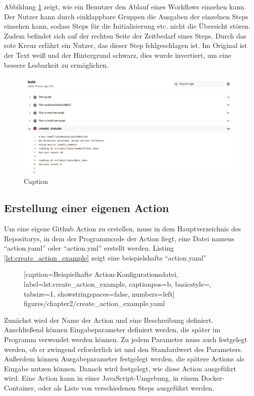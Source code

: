 Abbildung \ref{fig:workflow_output} zeigt, wie ein Benutzer den Ablauf eines Workflows einsehen kann. Der Nutzer kann durch einklappbare Gruppen die Ausgaben der einzelnen Steps einsehen kann, sodass Steps für die Initialisierung etc. nicht die Übersicht stören. Zudem befindet sich auf der rechten Seite der Zeitbedarf eines Steps. Durch das rote Kreuz erfährt ein Nutzer, das dieser Step fehlgeschlagen ist. Im Original ist der Text weiß und der Hintergrund schwarz, dies wurde invertiert, um eine bessere Lesbarkeit zu ermöglichen. 
\begin{figure}
    \centering
    \includegraphics[width=\columnwidth]{figures/chapter2/workflow_output2.png}
    \caption{Caption}
    \label{fig:workflow_output}
\end{figure}
\subsection{Erstellung einer eigenen Action}
Um eine eigene Github Action zu erstellen, muss in dem Hauptverzeichnis des Repositorys, in dem der Programmcode der Action liegt, eine Datei namens \enquote{action.yaml} oder \enquote{action.yml} erstellt werden. Listing \ref{lst:create_action_example} zeigt eine beispielshafte \enquote{action.yaml}
	\begin{figure}[h!]
			
			[caption={Beispielhafte Action-Konfigurationsdatei},
			label={lst:create_action_example},
			captionpos=b, basicstyle=\footnotesize, tabsize=1, showstringspaces=false,  numbers=left]
			{figures/chapter2/create_action_example.yaml}
		\end{figure}
Zunächst wird der Name der Action und eine Beschreibung definiert. Anschließend können Eingabeparameter definiert werden, die später im Programm verwendet werden können. Zu jedem Parameter muss auch festgelegt werden, ob er zwingend erforderlich ist und den Standardwert des Parameters. Außerdem können Ausgabeparameter festgelegt werden, die spätere Actions als Eingabe nutzen können. Danach wird festgelegt, wie diese Action ausgeführt wird. Eine Action kann in einer JavaScript-Umgebung, in einem Docker-Container, oder als Liste von verschiedenen Steps ausgeführt werden. 


